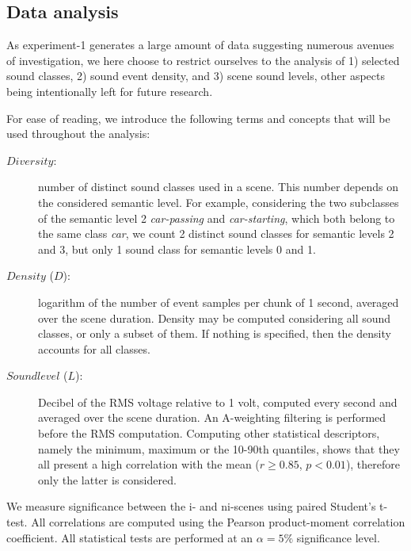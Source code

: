 \documentclass[twoside,twocolumn]{article}
\begin{document}
\subsection{Data analysis}

As experiment-1 generates a large amount of data suggesting numerous avenues of investigation, we here choose to restrict ourselves to the analysis of 1) selected sound classes, 2) sound event density, and 3) scene sound levels, other aspects being intentionally left for future research.

For ease of reading, we introduce the following terms and concepts that will be used throughout the analysis: 
\begin{description}
\item[$Diversity$:] number of distinct sound classes used in a scene. This number depends on the considered semantic level. For example, considering the two subclasses of the semantic level 2 \textit{car-passing} and \textit{car-starting}, which both belong to the same class \textit{car}, we count 2 distinct sound classes for semantic levels 2 and 3, but only 1 sound class for semantic levels 0 and 1. 
\item[$Density$ ($D$):] logarithm of the number of event samples per chunk of 1 second, averaged over the scene duration. Density may be computed considering all sound classes, or only a subset of them. If nothing is specified, then the density accounts for all classes.  
\item[$Sound level$ ($L$):]  Decibel of the RMS voltage relative to 1 volt, computed every second and averaged over the scene duration. An A-weighting filtering is performed before the RMS computation. Computing other statistical descriptors, namely the minimum, maximum or the 10-90th quantiles, shows that they all present a high correlation with the mean ($r\geq0.85$, $p<0.01$), therefore only the latter is considered.
\end{description}

We measure significance between the i- and ni-scenes using paired Student's t-test. All correlations are computed using the Pearson product-moment correlation coefficient. All statistical tests are performed at an $\alpha=5\%$ significance level.


\end{document}
